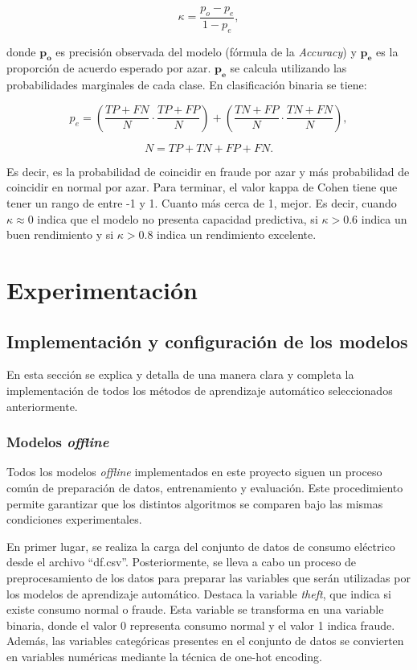 \documentclass[12pt,a4paper]{report}
\begin{document}
\[
\kappa = \frac{p_o - p_e}{1 - p_e}
,\]

\noindent donde $\mathbf{p_o}$ es precisión observada del modelo (fórmula de la \emph{Accuracy}) y $\mathbf{p_e}$ es la proporción de acuerdo esperado por azar. $\mathbf{p_e}$ se calcula utilizando las probabilidades marginales de cada clase. En clasificación binaria se tiene:

\[
p_e =
\left( \frac{TP + FN}{N} \cdot \frac{TP + FP}{N} \right)
+
\left( \frac{TN + FP}{N} \cdot \frac{TN + FN}{N} \right)
,\]

\[
N = TP + TN + FP + FN
.\]

Es decir, es la probabilidad de coincidir en fraude por azar y más probabilidad de coincidir en normal por azar. Para terminar, el valor kappa de Cohen tiene que tener un rango de entre -1 y 1. Cuanto más cerca de 1, mejor. Es decir, cuando $\kappa \approx 0$ indica que el modelo no presenta capacidad predictiva, si $\kappa > 0{.}6$ indica un buen rendimiento y si $\kappa > 0{.}8$ indica un rendimiento excelente.


\chapter{Experimentación}


\section{Implementación y configuración de los modelos}

En esta sección se explica y detalla de una manera clara y completa la implementación de todos los métodos de aprendizaje automático seleccionados anteriormente.


\subsection{Modelos \emph{offline}}

Todos los modelos \emph{offline} implementados en este proyecto siguen un proceso común de preparación de datos, entrenamiento y evaluación. Este procedimiento permite garantizar que los distintos algoritmos se comparen bajo las mismas condiciones experimentales.

En primer lugar, se realiza la carga del conjunto de datos de consumo eléctrico desde el archivo ``df.csv''. Posteriormente, se lleva a cabo un proceso de preprocesamiento de los datos para preparar las variables que serán utilizadas por los modelos de aprendizaje automático. Destaca la variable \emph{theft}, que indica si existe consumo normal o fraude. Esta variable se transforma en una variable binaria, donde el valor 0 representa consumo normal y el valor 1 indica fraude. Además, las variables categóricas presentes en el conjunto de datos se convierten en variables numéricas mediante la técnica de one-hot encoding.
\end{document}

